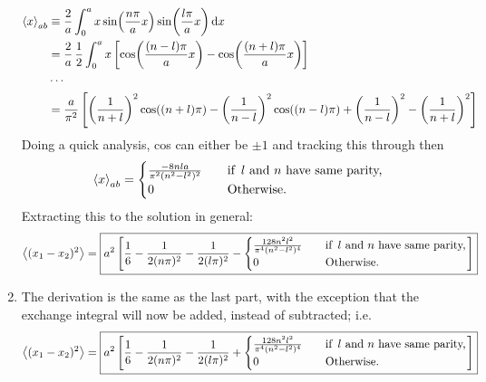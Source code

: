 \documentclass[11pt]{article}
\begin{document}
\begin{enumerate}[label=\alph*)]
\begin{align*}
\ev{x}_{ab} & \equiv \frac{2}{a}\int_0^a x \sin(\frac{n\pi}{a}x)\sin(\frac{l\pi}{a}x)\dd{x}\\
& = \frac{2}{a}\, \frac{1}{2}\int_0^a x\left[\cos(\frac{(n-l)\pi}{a}x) - \cos(\frac{(n+l)\pi}{a}x)\right]\\
& \cdots\\
& = \frac{a}{\pi^2} \left[\left(\frac{1}{n+l}\right)^2 \cos((n+l)\pi) - \left(\frac{1}{n-l}\right)^2\cos((n-l)\pi) + \left(\frac{1}{n-l}\right)^2 - \left(\frac{1}{n+l}\right)^2\right]
\end{align*}
Doing a quick analysis, cos can either be $\pm 1$ and tracking this through then 
\begin{align*}
\ev{x}_{ab} = \begin{cases}
          \frac{-8nla}{\pi^2(n^2 - l^2)^2} \quad &\text{if } \, l \text{ and } n \text{ have same parity,}\\
          0 \quad & \text{Otherwise.} \\
     \end{cases}
\end{align*}
Extracting this to the solution in general:
\begin{align*}
\ev{(x_1 - x_2)^2} = \boxed{a^2\left[\frac{1}{6} - \frac{1}{2(n\pi)^2} - \frac{1}{2(l\pi)^2} - \begin{cases}
          \frac{128n^2l^2}{\pi^4(n^2 - l^2)^4} \quad &\text{if } \, l \text{ and } n \text{ have same parity,}\\
          0 \quad & \text{Otherwise.} \\
     \end{cases}\right]}
\end{align*}
\item The derivation is the same as the last part, with the exception that the exchange integral will now be added, instead of subtracted; i.e.
\begin{align*}
\ev{(x_1 - x_2)^2} = \boxed{a^2\left[\frac{1}{6} - \frac{1}{2(n\pi)^2} - \frac{1}{2(l\pi)^2} + \begin{cases}
          \frac{128n^2l^2}{\pi^4(n^2 - l^2)^4} \quad &\text{if } \, l \text{ and } n \text{ have same parity,}\\
          0 \quad & \text{Otherwise.} \\
     \end{cases}\right]}
\end{align*}
\end{enumerate}
\end{document}
